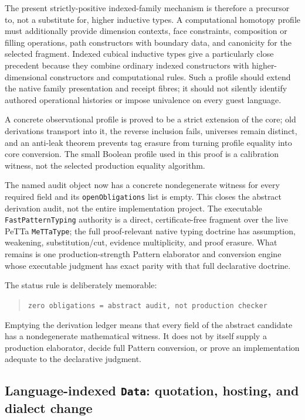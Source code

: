 \documentclass[11pt]{article}
\newcommand{\code}[1]{\texttt{#1}}
\begin{document}
The present strictly-positive indexed-family mechanism is therefore a precursor
to, not a substitute for, higher inductive types.  A computational homotopy
profile must additionally provide dimension contexts, face constraints,
composition or filling operations, path constructors with boundary data, and
canonicity for the selected fragment.  Indexed cubical inductive types give a
particularly close precedent because they combine ordinary indexed
constructors with higher-dimensional constructors and computational rules.
Such a profile should extend the native family presentation and receipt fibres;
it should not silently identify authored operational histories or impose
univalence on every guest language.

A concrete observational profile is proved to be a strict extension of the core;
old derivations transport into it, the reverse inclusion fails, universes remain
distinct, and an anti-leak theorem prevents tag erasure from turning profile
equality into core conversion.  The small Boolean profile used in this proof is a
calibration witness, not the selected production equality algorithm.

The named audit object now has a concrete nondegenerate witness for every required
field and its \code{openObligations} list is empty.  This closes the abstract
derivation audit, not the entire implementation project.  The executable
\code{FastPatternTyping} authority is a direct, certificate-free fragment over
the live PeTTa \code{MeTTaType}; the full proof-relevant native typing doctrine has
assumption, weakening, substitution/cut, evidence multiplicity, and proof erasure.
What remains is one production-strength Pattern elaborator and conversion engine
whose executable judgment has exact parity with that full declarative doctrine.

The status rule is deliberately memorable:
\begin{quote}
\code{zero obligations = abstract audit, not production checker}
\end{quote}
Emptying the derivation ledger means that every field of the abstract candidate
has a nondegenerate mathematical witness.  It does not by itself supply a
production elaborator, decide full Pattern conversion, or prove an implementation
adequate to the declarative judgment.

\subsection{Language-indexed \code{Data}: quotation, hosting, and dialect change}
\end{document}
